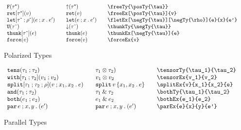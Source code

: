 \documentclass[11pt]{article}
\begin{document}
\begin{figure}

  \begin{small}
    \begin{displaymath}
      \begin{array}{l@{\qquad}l@{\qquad}l@{\qquad}l}
        \freeTy{\posTy{\tau}}                         & \freeTy*{\posTy{\tau}}    & \verb|\freeTy{\posTy{\tau}}|                         \\
        \freeEx[\posTy{\tau}]{v}                      & \freeEx*[\posTy{\tau}]{v} & \verb|\freeEx[\posTy{\tau}]{v}|                      \\
        \fletEx[\negTy{\tau}][\negTy{\rho}]{e}{x}{e'} & \fletEx*{e}{x}{e'}        & \verb|\fletEx[\negTy{\tau}][\negTy{\rho}]{e}{x}{e'}| \\
        \thunkTy{\negTy{\tau}}                        & \thunkTy*{\negTy{\tau}}   & \verb|\thunkTy{\negTy{\tau}}|                        \\
        \thunkEx[\negTy{\tau}]{e}                     & \thunkEx*{e}              & \verb|\thunkEx[\negTy{\tau}]{e}|                     \\
        \forceEx{v}                                   & \forceEx*{v}              & \verb|\forceEx{v}|
      \end{array}
    \end{displaymath}
  \end{small}

  \caption{Polarized Types}
  \label{fig:pol}
\end{figure}

\begin{figure}

  \begin{small}
    \begin{displaymath}
      \begin{array}{l@{\qquad}l@{\qquad}l@{\qquad}l}
        \tensorTy{\tau_1}{\tau_2} & \tensorTy*{\tau_1}{\tau_2} & \verb|\tensorTy{\tau_1}{\tau_2}| \\
        \tensorEx{v_1}{v_2}       & \tensorEx*{v_1}{v_2}       & \verb|\tensorEx{v_1}{v_2}|       \\
        \splitEx{v}{x_1}{x_2}{e}  & \splitEx*{v}{x_1}{x_2}{e}  & \verb|\splitEx{v}{x_1}{x_2}{e}|  \\
        \bothTy{\tau_1}{\tau_2}   & \bothTy*{\tau_1}{\tau_2}   & \verb|\bothTy{\tau_1}{\tau_2}|   \\
        \bothEx{e_1}{e_2}         & \bothEx*{e_1}{e_2}         & \verb|\bothEx{e_1}{e_2}|         \\
        \parEx{e}{x}{y}{e'}       & \parEx*{e}{x}{y}{e'}       & \verb|\parEx{e}{x}{y}{e'}|
      \end{array}
    \end{displaymath}
  \end{small}

  \caption{Parallel Types}
  \label{fig:par}
\end{figure}
\end{document}
